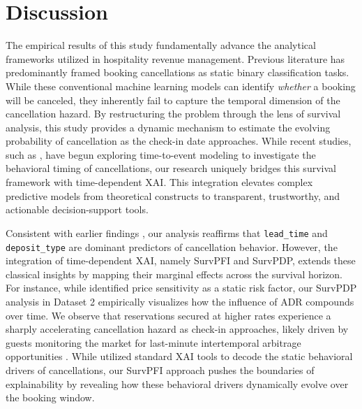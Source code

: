 \documentclass[pdflatex,sn-mathphys-ay]{sn-jnl}%
\theoremstyle{thmstyleone}%
\theoremstyle{thmstyletwo}%
\theoremstyle{thmstylethree}%
\begin{document}
\section{Discussion} %
\label{sec:discussion}

The empirical results of this study fundamentally advance the analytical frameworks utilized in hospitality revenue management. Previous literature \citep{antonio2017predicting, falk2018modelling, chen2023prediction} has predominantly framed booking cancellations as static binary classification tasks. While these conventional machine learning models can identify \textit{whether} a booking will be canceled, they inherently fail to capture the temporal dimension of the cancellation hazard. By restructuring the problem through the lens of survival analysis, this study provides a dynamic mechanism to estimate the evolving probability of cancellation as the check-in date approaches. While recent studies, such as \cite{mir2026decoding}, have begun exploring time-to-event modeling to investigate the behavioral timing of cancellations, our research uniquely bridges this survival framework with time-dependent XAI. This integration elevates complex predictive models from theoretical constructs to transparent, trustworthy, and actionable decision-support tools.

Consistent with earlier findings \citep{antonio2019big, yang2024predicting}, our analysis reaffirms that \texttt{lead\_time} and \texttt{deposit\_type} are dominant predictors of cancellation behavior. However, the integration of time-dependent XAI, namely SurvPFI and SurvPDP, extends these classical insights by mapping their marginal effects across the survival horizon. For instance, while \cite{liu2023hospitality} identified price sensitivity as a static risk factor, our SurvPDP analysis in Dataset 2 empirically visualizes how the influence of ADR compounds over time. We observe that reservations secured at higher rates experience a sharply accelerating cancellation hazard as check-in approaches, likely driven by guests monitoring the market for last-minute intertemporal arbitrage opportunities \citep{mir2026decoding}. While \cite{talal2025hotel} utilized standard XAI tools to decode the static behavioral drivers of cancellations, our SurvPFI approach pushes the boundaries of explainability by revealing how these behavioral drivers dynamically evolve over the booking window.
\end{document}
